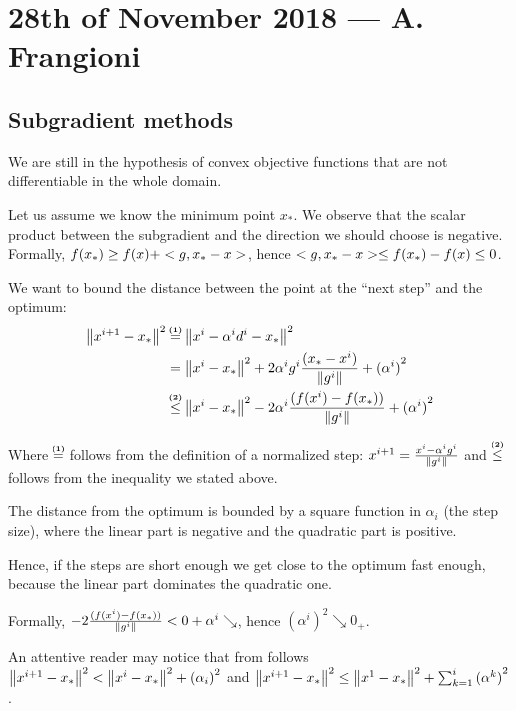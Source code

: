 \documentclass[ComputationalMathematics.tex]{subfiles}
\begin{document}
\section{28th of November 2018 --- A. Frangioni}

\subsection{Subgradient methods}
We are still in the hypothesis of convex objective functions that are not differentiable in the whole domain.


Let us assume we know the minimum point $x_*$. We observe that the scalar product between the subgradient and the direction we should choose is negative.
Formally, $f(x_*) \ge f(x) + <g, x_* - x>$, hence $<g, x_*-x> \le f(x_*) - f(x) \le 0$.

We want to bound the distance between the point at the ``next step'' and the optimum:
\begin{equation}
  \begin{aligned}
    \sqrnorm{x^{i+1} - x_*} &\numeq{(1)} \sqrnorm{x^i - \alpha^i d^i - x_*}\\
    &= \sqrnorm{x^i  - x_*} + 2\alpha^i g^i \frac{(x_* - x^i)}{\norm{g^i}} + {(\alpha^i)}^2\\
    &\numineq{(2)}{\le} \sqrnorm{x^i  - x_*} - 2 \alpha^i \frac{(f(x^i) - f(x_*))}{\norm{g^i}} + {(\alpha^i)}^2
  \end{aligned}\label{eq:28nov1}
\end{equation}

Where $\numeq{(1)}$ follows from the definition of a normalized step: $x^{i+1} = \frac{x^i - \alpha^i g^i}{\left\lVert g^i\right\rVert}$ and $\numineq{(2)}{\le}$ follows from the inequality we stated above.

\begin{obs}
  The distance from the optimum is bounded by a square function in $\alpha_i$ (the step size), where the linear part is negative and the quadratic part is positive.
  
  Hence, if the steps are short enough we get close to the optimum fast enough, because the linear part dominates the quadratic one.
  
  Formally, $- 2 \frac{(f(x^i) - f(x_*))}{\left\lVert g^i\right\rVert} < 0 + \alpha ^i \searrow$, hence ${(\alpha^i)}^2 \searrow 0_+$.

  An attentive reader may notice that from  follows ${\left\lVert x^{i+1}  - x_*\right\rVert}^2 < {\left\lVert x^i  - x_*\right\rVert}^2 + {(\alpha_i)}^2$ and ${\left\lVert x^{i+1} - x_*\right\rVert}^2 \leq {\left\lVert x^1  - x_*\right\rVert}^2 + \sum_{k = 1}^i {(\alpha^k)}^2$.
\end{obs}
\end{document}
